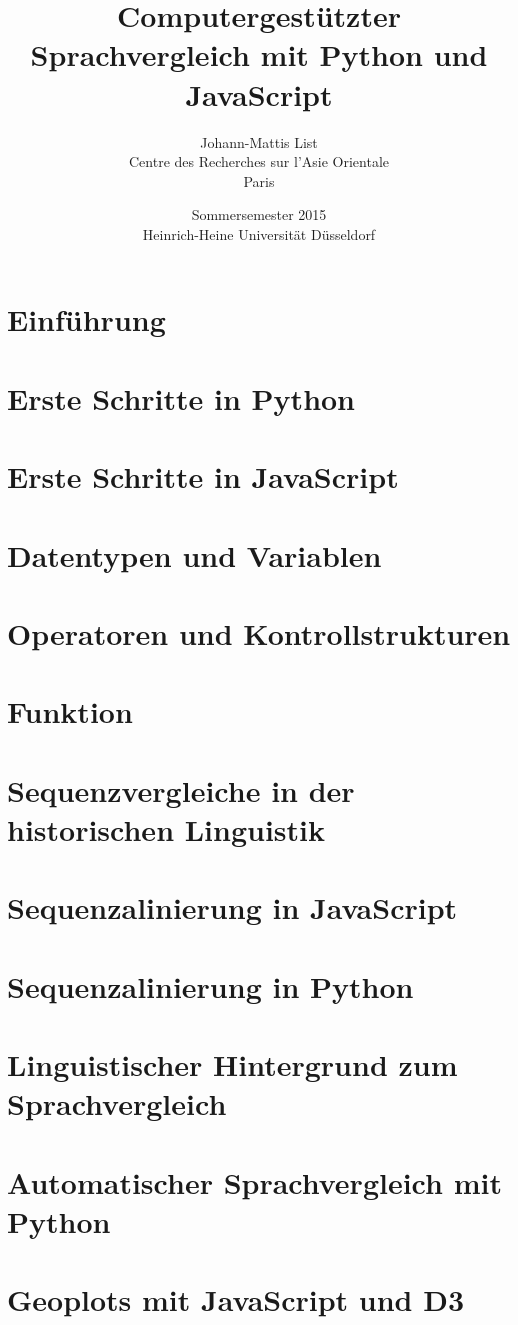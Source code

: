 \documentclass[xetex,11pt]{scrartcl}
\title{Computergestützter Sprachvergleich mit Python und JavaScript}
\author{Johann-Mattis List \\ Centre des Recherches sur l'Asie Orientale \\ Paris}
\date{Sommersemester 2015 \\ Heinrich-Heine Universität Düsseldorf}
\begin{document}
\maketitle
\tableofcontents
\pagebreak
\section{Einführung}

\section{Erste Schritte in Python}

\section{Erste Schritte in JavaScript}

\section{Datentypen und Variablen}

\section{Operatoren und Kontrollstrukturen}

\section{Funktion}

\section{Sequenzvergleiche in der historischen Linguistik}

\section{Sequenzalinierung in JavaScript}

\section{Sequenzalinierung in Python}

\section{Linguistischer Hintergrund zum Sprachvergleich}

\section{Automatischer Sprachvergleich mit Python}

\section{Geoplots mit JavaScript und D3}

\end{document}
